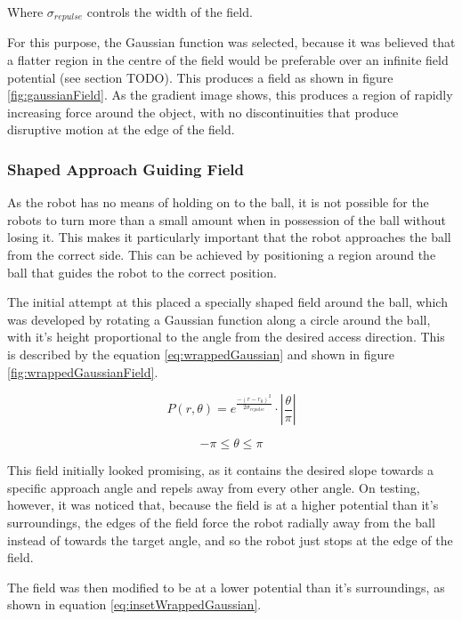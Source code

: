 \documentclass[10pt]{article} \usepackage[a4paper]{geometry}
\begin{document}
Where $\sigma_{repulse}$ controls the width of the field.

For this purpose, the Gaussian function was selected, because it was believed
that a flatter region in the centre of the field would be preferable over an
infinite field potential (see section TODO). This produces a field as shown in
figure \ref{fig:gaussianField}. As the gradient image shows, this produces a
region of rapidly increasing force around the object, with no discontinuities
that produce disruptive motion at the edge of the field.

\subsubsection{Shaped Approach Guiding Field\label{sub:Shaped-Approach-Guiding}}

As the robot has no means of holding on to the ball, it is not possible for the
robots to turn more than a small amount when in possession of the ball without
losing it. This makes it particularly important that the robot approaches the
ball from the correct side. This can be achieved by positioning a region around
the ball that guides the robot to the correct position.

The initial attempt at this placed a specially shaped field around the ball,
which was developed by rotating a Gaussian function along a circle around the
ball, with it's height proportional to the angle from the desired access
direction. This is described by the equation \ref{eq:wrappedGaussian} and shown
in figure \ref{fig:wrappedGaussianField}.

\begin{equation}
P\left(r,\theta\right)=e^{\frac{-\left(r-r_{0}\right)^{2}}{2\sigma_{repulse}}}\cdot\left|\frac{\theta}{\pi}\right|\label{eq:wrappedGaussian}
\end{equation}

\[
-\pi\leq\theta\leq\pi
\]

This field initially looked promising, as it contains the desired slope towards
a specific approach angle and repels away from every other angle. On testing,
however, it was noticed that, because the field is at a higher potential than
it's surroundings, the edges of the field force the robot radially away from the
ball instead of towards the target angle, and so the robot just stops at the
edge of the field.

The field was then modified to be at a lower potential than it's surroundings,
as shown in equation \ref{eq:insetWrappedGaussian}.
\end{document}
